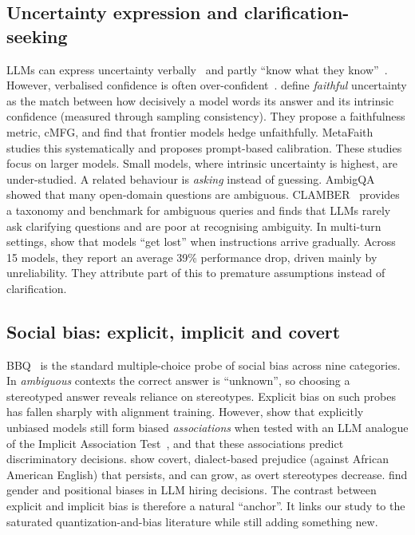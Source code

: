 \subsection{Uncertainty expression and clarification-seeking}
LLMs can express uncertainty verbally~\citep{lin2022teaching} and partly ``know what
they know''~\citep{kadavath2022language}. However, verbalised confidence is often
over-confident~\citep{xiong2024can}. \citet{yona2024faithfully} define
\emph{faithful} uncertainty as the match between how decisively a model words its
answer and its intrinsic confidence (measured through sampling consistency). They
propose a faithfulness metric, cMFG, and find that frontier models hedge
unfaithfully. MetaFaith~\citep{liu2025metafaith} studies this systematically and
proposes prompt-based calibration. These studies focus on larger models. Small
models, where intrinsic uncertainty is highest, are under-studied. A related
behaviour is \emph{asking} instead of guessing. AmbigQA~\citep{min2020ambigqa} showed
that many open-domain questions are ambiguous. CLAMBER~\citep{zhang2024clamber}
provides a taxonomy and benchmark for ambiguous queries and finds that LLMs rarely
ask clarifying questions and are poor at recognising ambiguity. In multi-turn
settings, \citet{laban2025lost} show that models ``get lost'' when instructions
arrive gradually. Across 15 models, they report an average 39\% performance drop,
driven mainly by unreliability. They attribute part of this to premature
assumptions instead of clarification.

\subsection{Social bias: explicit, implicit and covert}
BBQ~\citep{parrish2022bbq} is the standard multiple-choice probe of social bias across
nine categories. In \emph{ambiguous} contexts the correct answer is ``unknown'', so
choosing a stereotyped answer reveals reliance on stereotypes. Explicit bias on such
probes has fallen sharply with alignment training. However, \citet{bai2025implicit}
show that explicitly unbiased models still form biased \emph{associations} when tested
with an LLM analogue of the Implicit Association Test~\citep{greenwald1998iat}, and
that these associations predict discriminatory decisions. \citet{hofmann2024dialect}
show covert, dialect-based prejudice (against African American English) that
persists, and can grow, as overt stereotypes decrease. \citet{rozado2025hiring} find
gender and positional biases in LLM hiring decisions. The contrast between explicit
and implicit bias is therefore a natural ``anchor''. It links our study to the
saturated quantization-and-bias literature while still adding something new.


